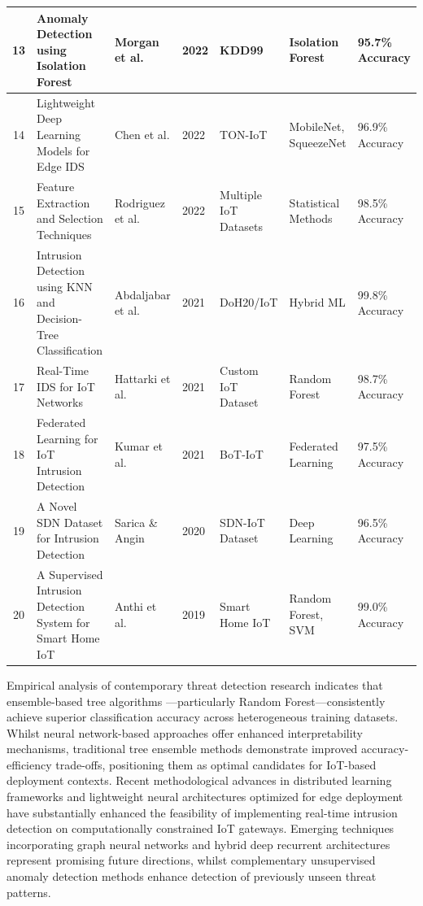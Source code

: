 \documentclass[conference]{IEEEtran}
\begin{document}
\begin{table}[t]
{\begin{tabular}{|c|p{3.8cm}|p{1.8cm}|p{1.6cm}|p{2.2cm}|p{2.5cm}|p{2.2cm}|}
13 & Anomaly Detection using Isolation Forest \cite{b13} & Morgan et al. & 2022 & KDD99 & Isolation Forest & 95.7\% Accuracy \\
\hline
14 & Lightweight Deep Learning Models for Edge IDS \cite{b14} & Chen et al. & 2022 & TON-IoT & MobileNet, SqueezeNet & 96.9\% Accuracy \\
\hline
15 & Feature Extraction and Selection Techniques \cite{b15} & Rodriguez et al. & 2022 & Multiple IoT Datasets & Statistical Methods & 98.5\% Accuracy \\
\hline
16 & Intrusion Detection using KNN and Decision-Tree Classification \cite{b16} & Abdaljabar et al. & 2021 & DoH20/IoT & Hybrid ML & 99.8\% Accuracy \\
\hline
17 & Real-Time IDS for IoT Networks \cite{b17} & Hattarki et al. & 2021 & Custom IoT Dataset & Random Forest & 98.7\% Accuracy \\
\hline
18 & Federated Learning for IoT Intrusion Detection \cite{b18} & Kumar et al. & 2021 & BoT-IoT & Federated Learning & 97.5\% Accuracy \\
\hline
19 & A Novel SDN Dataset for Intrusion Detection \cite{b19} & Sarica \& Angin & 2020 & SDN-IoT Dataset & Deep Learning & 96.5\% Accuracy \\
\hline
20 & A Supervised Intrusion Detection System for Smart Home IoT \cite{b20} & Anthi et al. & 2019 & Smart Home IoT & Random Forest, SVM & 99.0\% Accuracy \\
\hline
\end{tabular}}
\end{table}

Empirical analysis of contemporary threat detection research indicates that ensemble-based tree algorithms \cite{b21}—particularly Random Forest—consistently achieve superior classification accuracy across heterogeneous training datasets. Whilst neural network-based approaches \cite{b3} offer enhanced interpretability mechanisms, traditional tree ensemble methods \cite{b6} demonstrate improved accuracy-efficiency trade-offs, positioning them as optimal candidates for IoT-based deployment contexts. Recent methodological advances in distributed learning frameworks \cite{b18} and lightweight neural architectures optimized for edge deployment \cite{b14} have substantially enhanced the feasibility of implementing real-time intrusion detection on computationally constrained IoT gateways. Emerging techniques incorporating graph neural networks \cite{b9} and hybrid deep recurrent architectures \cite{b11} represent promising future directions, whilst complementary unsupervised anomaly detection methods \cite{b13} enhance detection of previously unseen threat patterns.
\end{document}
